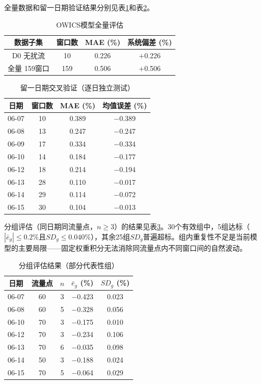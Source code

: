 全量数据和留一日期验证结果分别见表\ref{tab:q2_results}和表\ref{tab:q2_cv}。

\begin{table}[H]
\centering
\caption{OWICS模型全量评估}
\label{tab:q2_results}
\begin{tabular}{cccc}
\toprule
数据子集 & 窗口数 & MAE (\%) & 系统偏差 (\%) \\
\midrule
D0 无扰流 & 10 & 0.226 & $+$0.226 \\
全量 159窗口 & 159 & 0.506 & $+$0.506 \\
\bottomrule
\end{tabular}
\end{table}

\begin{table}[H]
\centering
\caption{留一日期交叉验证（逐日独立测试）}
\label{tab:q2_cv}
\begin{tabular}{cccc}
\toprule
日期 & 窗口数 & MAE (\%) & 均值误差 (\%) \\
\midrule
06-07 & 10 & 0.389 & $-$0.389 \\
06-08 & 13 & 0.247 & $-$0.247 \\
06-09 & 17 & 0.334 & $-$0.334 \\
06-10 & 14 & 0.184 & $-$0.177 \\
06-12 & 18 & 0.214 & $-$0.194 \\
06-13 & 28 & 0.110 & $-$0.017 \\
06-14 & 29 & 0.114 & $-$0.072 \\
06-15 & 30 & 0.104 & $-$0.013 \\
\bottomrule
\end{tabular}
\end{table}

分组评估（同日期同流量点，$n \ge 3$）的结果见表\ref{tab:q2_groups}。30个有效组中，5组达标（$|\bar{e}_g| \le 0.2\%$且$SD_g \le 0.040\%$），其余25组$SD_g$普遍超标。组内重复性不足是当前模型的主要局限——固定权重积分无法消除同流量点内不同窗口间的自然波动。

\begin{table}[H]
\centering
\caption{分组评估结果（部分代表性组）}
\label{tab:q2_groups}
\begin{tabular}{ccccc}
\toprule
日期 & 流量点 & $n$ & $\bar{e}_g$ (\%) & $SD_g$ (\%) \\
\midrule
06-07 & 60 & 3 & $-$0.423 & 0.023 \\
06-08 & 60 & 5 & $-$0.328 & 0.056 \\
06-10 & 70 & 3 & $-$0.175 & 0.010 \\
06-12 & 70 & 3 & $-$0.234 & 0.106 \\
06-13 & 70 & 6 & $-$0.035 & 0.098 \\
06-14 & 50 & 3 & $-$0.188 & 0.024 \\
06-15 & 70 & 5 & $-$0.064 & 0.029 \\
\bottomrule
\end{tabular}
\end{table}

